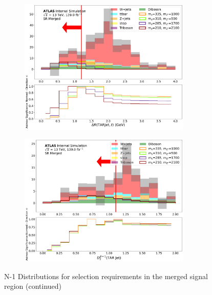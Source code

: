  \begin{figure} \ContinuedFloat
    \begin{subfigure}[t]{0.48\textwidth}
    \centering
     \includegraphics[width = 0.9\textwidth]{Figures/5/SR1L_Merged/dR_lep_TARJets10_normSig_N_1.pdf}
    \caption{\drTARl}
    \end{subfigure}
    \begin{subfigure}[t]{0.48\textwidth}
    \centering
     \includegraphics[width = 0.9\textwidth]{Figures/5/SR1L_Merged/TARJets10_TAR_D20_normSig_N_1.pdf}
    \caption{\DtwoTAR}
    \end{subfigure}
    \caption{N-1 Distributions for selection requirements in the merged signal region (continued)}
  \end{figure}
  
